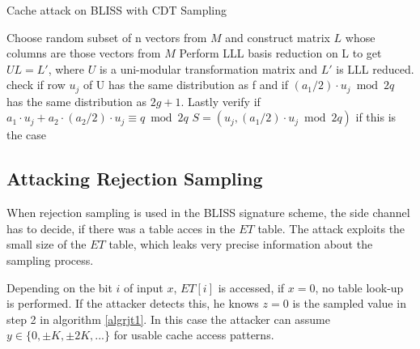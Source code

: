 \begin{algorithm}
	\caption{Cache attack on BLISS with CDT Sampling}
	\label{algcdtattack}
	\begin{algorithmic}[1]
		\EndIf
		\EndFor
		\EndWhile
			\State Choose random subset of n vectors from $M$ and construct matrix $L$ whose columns are those vectors from $M$
			\State Perform LLL basis reduction on L to get $UL = L'$, where $U$ is a uni-modular transformation matrix and $L'$ is LLL reduced.
				\State check if row $u_j$ of U has the same distribution as f and if $(a_1/2)\cdot u_j \bmod 2q$ has the same distribution as $2g+1$. Lastly verify if $a_1 \cdot u_j + a_2 \cdot (a_2/2)\cdot u_j \equiv q \bmod 2q$
				\State
				\Return $S = (u_j, (a_1/2)\cdot u_j \bmod 2q)$ if this is the case
			\EndFor
		\EndWhile
	\end{algorithmic}
\end{algorithm} 
\subsection{Attacking Rejection Sampling} \label{rejection}
When rejection sampling is used in the BLISS signature scheme, the side channel has to decide, if there was a table acces in the $ET$ table. The attack exploits the small size of the $ET$ table, which leaks very precise information about the sampling process.

Depending on the bit $i$ of input $x$, $ET[i]$ is accessed, if $x = 0$, no table look-up is performed. If the attacker detects this, he knows $z=0$ is the sampled value in step 2 in algorithm \ref{algrjt1}. In this case the attacker can assume $y \in \{0, \pm K, \pm 2K,...\}$ for usable cache access patterns.

